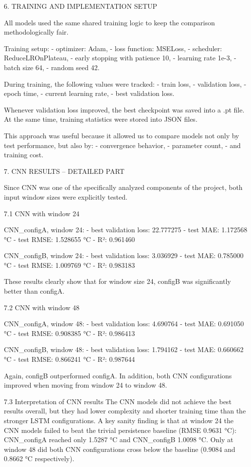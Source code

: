 6. TRAINING AND IMPLEMENTATION SETUP

All models used the same shared training logic to keep the comparison methodologically fair.

Training setup:
- optimizer: Adam,
- loss function: MSELoss,
- scheduler: ReduceLROnPlateau,
- early stopping with patience 10,
- learning rate 1e-3,
- batch size 64,
- random seed 42.

During training, the following values were tracked:
- train loss,
- validation loss,
- epoch time,
- current learning rate,
- best validation loss.

Whenever validation loss improved, the best checkpoint was saved into a .pt file. At the same time, training statistics were stored into JSON files.

This approach was useful because it allowed us to compare models not only by test performance, but also by:
- convergence behavior,
- parameter count,
- and training cost.

7. CNN RESULTS – DETAILED PART

Since CNN was one of the specifically analyzed components of the project, both input window sizes were explicitly tested.

7.1 CNN with window 24

CNN_configA, window 24:
- best validation loss: 22.777275
- test MAE: 1.172568 °C
- test RMSE: 1.528655 °C
- R²: 0.961460

CNN_configB, window 24:
- best validation loss: 3.036929
- test MAE: 0.785000 °C
- test RMSE: 1.009769 °C
- R²: 0.983183

These results clearly show that for window size 24, configB was significantly better than configA.

7.2 CNN with window 48

CNN_configA, window 48:
- best validation loss: 4.690764
- test MAE: 0.691050 °C
- test RMSE: 0.908385 °C
- R²: 0.986413

CNN_configB, window 48:
- best validation loss: 1.794162
- test MAE: 0.660662 °C
- test RMSE: 0.866241 °C
- R²: 0.987644

Again, configB outperformed configA. In addition, both CNN configurations improved when moving from window 24 to window 48.

7.3 Interpretation of CNN results
The CNN models did not achieve the best results overall, but they had lower complexity and shorter training time than the stronger LSTM configurations. A key sanity finding is that at window 24 the CNN models failed to beat the trivial persistence baseline (RMSE 0.9631 °C): CNN_configA reached only 1.5287 °C and CNN_configB 1.0098 °C. Only at window 48 did both CNN configurations cross below the baseline (0.9084 and 0.8662 °C respectively).


